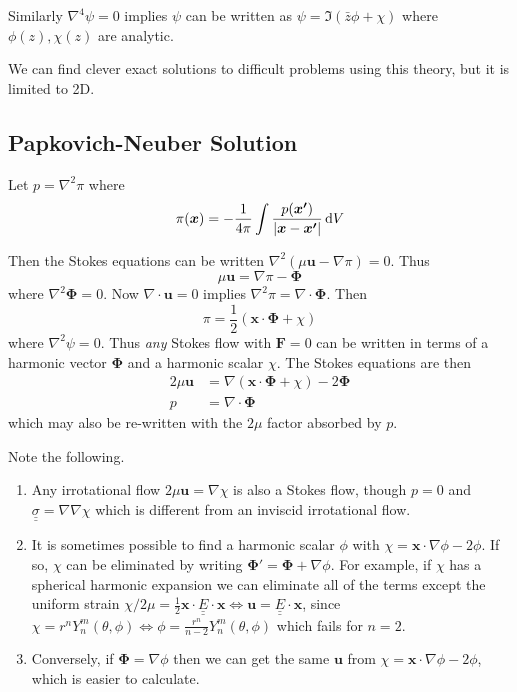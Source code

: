 \documentclass{jknotes}
\newcommand{\dunder}[1]{\underline{\underline{#1}}}
\begin{document}
Similarly $\nabla^4 \psi = 0$ implies $\psi$ can be written as $\psi =
\Im(\bar{z}\phi + \chi)$ where $\phi(z), \chi(z)$ are analytic.

We can find clever exact solutions to difficult problems using this theory,
but it is limited to 2D.

\subsection{Papkovich-Neuber Solution}
Let $p = \nabla^2 \pi$ where
\begin{equation}
	\pi(\bm{x}) = -\frac{1}{4\pi} \int \frac{p(\bm{x'})}{\left|
	\bm{x}-\bm{x'}\right|} \, \diffd V
\end{equation}

Then the Stokes equations can be written $\nabla^2 \left( \mu \bm{u} - \nabla
\pi\right) = 0$. Thus
\begin{equation}
	\mu \bm{u} = \nabla \pi - \bm{\Phi}
\end{equation}
where $\nabla^2 \bm{\Phi} = 0$. Now $\nabla \cdot \bm{u} = 0$ implies
$\nabla^2 \pi = \nabla \cdot \bm{\Phi}$. Then
\begin{equation}
	\pi = \frac{1}{2}\left(\bm{x}\cdot\bm{\Phi} + \chi\right)
\end{equation}
where $\nabla^2 \psi = 0$. Thus \emph{any} Stokes flow with $\bm{F} = 0$ can
be written in terms of a harmonic vector $\bm{\Phi}$ and a harmonic scalar
$\chi$. The Stokes equations are then
\begin{equation}
	\begin{aligned}
		2\mu \bm{u} &= \nabla \left(\bm{x} \cdot \bm{\Phi} + \chi\right) -
	2\bm{\Phi} \\
	p &= \nabla \cdot \bm{\Phi}
\end{aligned}
\end{equation}
which may also be re-written with the $2\mu$ factor absorbed by $p$.

Note the following.
\begin{enumerate}
	\item Any irrotational flow $2 \mu \bm{u} = \nabla \chi$ is also a Stokes
		flow, though $p = 0$ and $\dunder{\sigma} = \nabla \nabla \chi$ which
		is different from an inviscid irrotational flow.
	\item It is sometimes possible to find a harmonic scalar $\phi$ with
		$\chi = \bm{x} \cdot \nabla \phi - 2 \phi$. If so, $\chi$ can be
		eliminated by writing $\bm{\Phi}' = \bm{\Phi} + \nabla \phi$. For
		example, if $\chi$ has a spherical harmonic expansion we can eliminate
		all of the terms except the uniform strain $\chi/2\mu = \frac{1}{2}
		\bm{x} \cdot \dunder{E} \cdot \bm{x} \iff \bm{u} = \dunder{E} \cdot
		\bm{x}$, since $\chi = r^n Y_n^m(\theta,\phi) \iff \phi =
		\frac{r^n}{n-2} Y_n^m(\theta,\phi)$ which fails for $n=2$.
	\item Conversely, if $\bm{\Phi} = \nabla \phi$ then we can get the same
		$\bm{u}$ from $\chi = \bm{x} \cdot \nabla \phi - 2\phi$, which is
		easier to calculate.
\end{enumerate}
\end{document}
